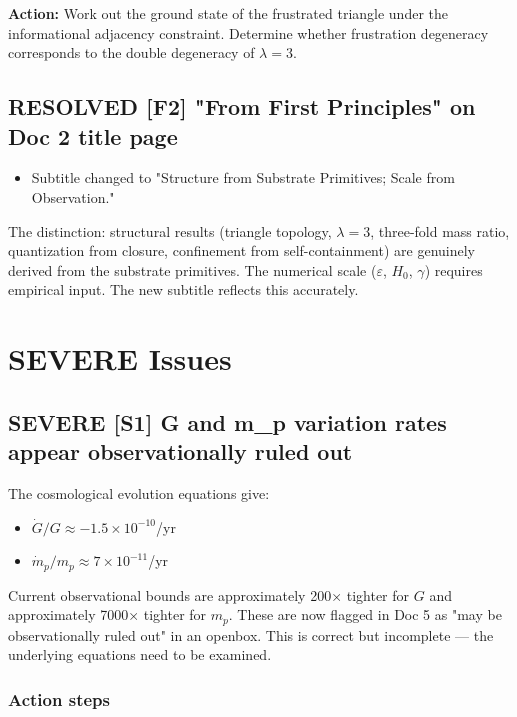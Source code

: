 \documentclass[11pt,letterpaper]{article}
\begin{document}
\textbf{Action:} Work out the ground state of the frustrated triangle under the informational adjacency constraint. Determine whether frustration degeneracy corresponds to the double degeneracy of \(\lambda = 3\).

\subsection{{\bfseries\sffamily RESOLVED} [F2] "From First Principles" on Doc 2 title page}
\label{sec:org8b3e677}
\begin{itemize}
\item[{$\boxtimes$}] Subtitle changed to "Structure from Substrate Primitives; Scale from Observation."
\end{itemize}

The distinction: structural results (triangle topology, \(\lambda = 3\), three-fold
mass ratio, quantization from closure, confinement from self-containment) are
genuinely derived from the substrate primitives. The numerical scale (\(\varepsilon\),
\(H_0\), \(\gamma\)) requires empirical input. The new subtitle reflects this
accurately.

\section{{\bfseries\sffamily SEVERE} Issues}
\label{sec:orge4253ed}

\subsection{{\bfseries\sffamily SEVERE} [S1] G and m\_p variation rates appear observationally ruled out}
\label{sec:org008b80a}
The cosmological evolution equations give:
\begin{itemize}
\item \(\dot{G}/G \approx -1.5 \times 10^{-10}\)/yr
\item \(\dot{m}_p/m_p \approx 7 \times 10^{-11}\)/yr
\end{itemize}

Current observational bounds are approximately 200× tighter for \(G\) and approximately 7000× tighter
for \(m_p\). These are now flagged in Doc 5 as "may be observationally ruled out"
in an openbox. This is correct but incomplete --- the underlying equations need
to be examined.

\subsubsection{Action steps}
\label{sec:org9be7d32}
\end{document}
